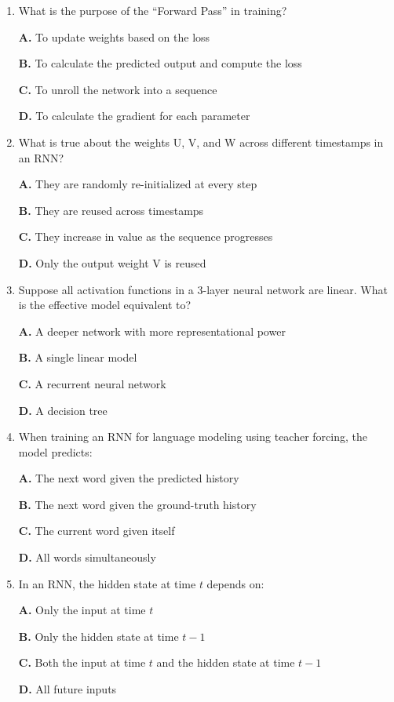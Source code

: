\documentclass[11pt]{article}
\begin{document}
\begin{enumerate}[label=Q\arabic*., leftmargin=*]
\item What is the purpose of the ``Forward Pass'' in training?

\textbf{A.} To update weights based on the loss

\textbf{B.} To calculate the predicted output and compute the loss

\textbf{C.} To unroll the network into a sequence

\textbf{D.} To calculate the gradient for each parameter

\item What is true about the weights U, V, and W across different timestamps in an RNN?

\textbf{A.} They are randomly re-initialized at every step

\textbf{B.} They are reused across timestamps

\textbf{C.} They increase in value as the sequence progresses

\textbf{D.} Only the output weight V is reused

\item Suppose all activation functions in a 3-layer neural network are linear. What is the effective model equivalent to?

\textbf{A.} A deeper network with more representational power

\textbf{B.} A single linear model

\textbf{C.} A recurrent neural network

\textbf{D.} A decision tree

\item When training an RNN for language modeling using teacher forcing, the model predicts:

\textbf{A.} The next word given the predicted history

\textbf{B.} The next word given the ground-truth history

\textbf{C.} The current word given itself

\textbf{D.} All words simultaneously

\item In an RNN, the hidden state at time $t$ depends on:

\textbf{A.} Only the input at time $t$

\textbf{B.} Only the hidden state at time $t-1$

\textbf{C.} Both the input at time $t$ and the hidden state at time $t-1$

\textbf{D.} All future inputs


\end{enumerate}
\end{document}

